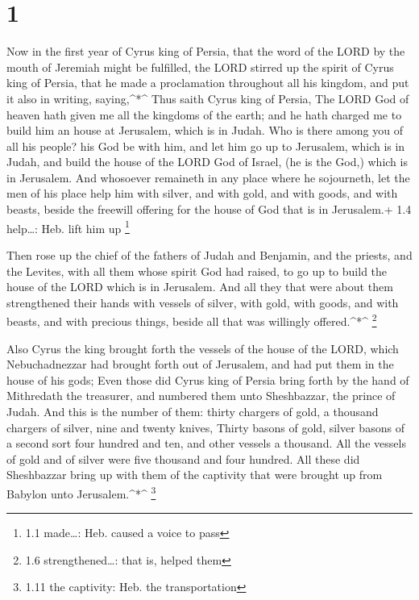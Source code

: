 \hypertarget{section}{%
\section{1}\label{section}}

 Now in the first year of Cyrus king of Persia, that the
word of the LORD by the mouth of Jeremiah might be fulfilled, the LORD
stirred up the spirit of Cyrus king of Persia, that he made a
proclamation throughout all his kingdom, and put it also in writing,
saying,\^{}*\^{}  Thus saith Cyrus king of Persia, The LORD
God of heaven hath given me all the kingdoms of the earth; and he hath
charged me to build him an house at Jerusalem, which is in Judah.
 Who is there among you of all his people? his God be with
him, and let him go up to Jerusalem, which is in Judah, and build the
house of the LORD God of Israel, (he is the God,) which is in Jerusalem.
 And whosoever remaineth in any place where he sojourneth,
let the men of his place help him with silver, and with gold, and with
goods, and with beasts, beside the freewill offering for the house of
God that is in Jerusalem.+ 1.4 help\ldots: Heb. lift him up \footnote{1.1
  made\ldots: Heb. caused a voice to pass}

 Then rose up the chief of the fathers of Judah and
Benjamin, and the priests, and the Levites, with all them whose spirit
God had raised, to go up to build the house of the LORD which is in
Jerusalem.  And all they that were about them strengthened
their hands with vessels of silver, with gold, with goods, and with
beasts, and with precious things, beside all that was willingly
offered.\^{}*\^{} \footnote{1.6 strengthened\ldots: that is, helped them}

 Also Cyrus the king brought forth the vessels of the house
of the LORD, which Nebuchadnezzar had brought forth out of Jerusalem,
and had put them in the house of his gods;  Even those did
Cyrus king of Persia bring forth by the hand of Mithredath the
treasurer, and numbered them unto Sheshbazzar, the prince of Judah.
 And this is the number of them: thirty chargers of gold, a
thousand chargers of silver, nine and twenty knives, 
Thirty basons of gold, silver basons of a second sort four hundred and
ten, and other vessels a thousand.  All the vessels of gold
and of silver were five thousand and four hundred. All these did
Sheshbazzar bring up with them of the captivity that were brought up
from Babylon unto Jerusalem.\^{}*\^{} \footnote{1.11 the captivity: Heb.
  the transportation}

